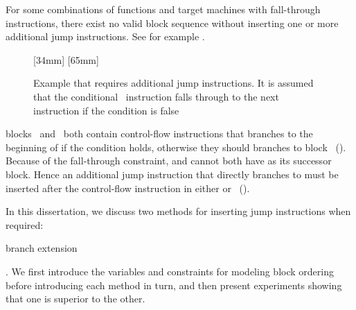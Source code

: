 For some combinations of \glspl{function} and \glspl{target machine} with
\gls{fall-through} \glspl{instruction}, there exist no valid \gls{block}
sequence without inserting one or more additional jump \glspl{instruction}.
%
See for example .
%
\begin{figure}
  \setlength{\nodeDist}{20pt}%

  \mbox{}%
  \hfill%
                [34mm]%
                {%
                }%
  \hfill%
                [65mm]%
                {%
                  \hspace{6mm}%
                }%
  \hfill%
  \mbox{}

  \caption[Example that requires additional jump instructions]%
          {%
            Example that requires additional jump instructions.
            It is assumed that the conditional ~instruction
            falls through to the next instruction if the condition is false%
          }
\end{figure}
%
\Glspl{block}~ and~ both contain control-flow
\glspl{instruction} that branches to the beginning of  if the
condition holds, otherwise they should branches to block~
().
%
Because of the fall-through \gls{constraint},  and 
cannot both have  as its successor \gls{block}.
%
Hence an additional jump \gls{instruction} that directly branches to
 must be inserted after the control-flow \gls{instruction} in either
 or~ ().

In this dissertation, we discuss two methods for inserting jump
\glspl{instruction} when required:
%
\begin{inlinelist}[itemjoin={\ }, itemjoin*={\ and}]
  \item \gls{branch extension}
  \item {}
\end{inlinelist}.
%
We first introduce the \glspl{variable} and \glspl{constraint} for modeling
\gls{block ordering} before introducing each method in turn, and then present
experiments showing that one is superior to the other.


